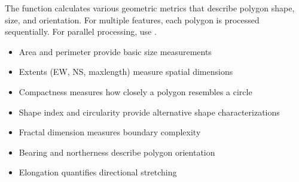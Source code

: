 \documentclass[letterpaper]{book}
\begin{document}
\begin{Details}
The function calculates various geometric metrics that describe polygon shape,
size, and orientation. For multiple features, each polygon is processed
sequentially. For parallel processing, use
.

\begin{itemize}

\item{} Area and perimeter provide basic size measurements
\item{} Extents (EW, NS, maxlength) measure spatial dimensions

\end{itemize}


\begin{itemize}

\item{} Compactness measures how closely a polygon resembles a circle
\item{} Shape index and circularity provide alternative shape characterizations
\item{} Fractal dimension measures boundary complexity

\end{itemize}


\begin{itemize}

\item{} Bearing and northerness describe polygon orientation
\item{} Elongation quantifies directional stretching

\end{itemize}

\end{Details}
%
\end{document}
